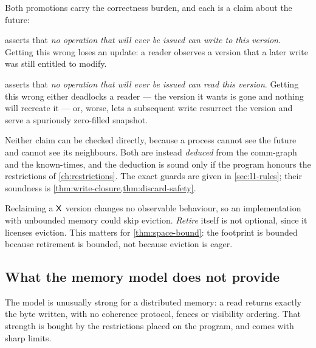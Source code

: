Both promotions carry the correctness burden, and each is a claim about the
future:

\begin{description}[leftmargin=1.4cm,style=nextline,font=\normalfont\bfseries]
  \item[\emph{publish}] asserts that \emph{no operation that will ever be
    issued can write to this version}. Getting this wrong loses an update: a
    reader observes a version that a later write was still entitled to modify.
  \item[\emph{retire}] asserts that \emph{no operation that will ever be
    issued can read this version}. Getting this wrong either deadlocks a
    reader --- the version it wants is gone and nothing will recreate it ---
    or, worse, lets a subsequent write resurrect the version and serve
    a spuriously zero-filled snapshot.
\end{description}

Neither claim can be checked directly, because a process cannot see the future
and cannot see its neighbours. Both are instead \emph{deduced} from the
\gls{comm-graph} and the \glspl{known-time}, and the deduction is sound only if the
program honours the restrictions of \cref{ch:restrictions}. The exact guards are
given in \cref{sec:l1-rules}; their soundness is
\cref{thm:write-closure,thm:discard-safety}.

\begin{remark}
Reclaiming a $\mathsf{X}$ version changes no observable behaviour, so an
implementation with unbounded memory could skip eviction. \emph{Retire} itself
is not optional, since it licenses eviction. This matters for
\cref{thm:space-bound}: the \gls{footprint} is bounded because retirement is
bounded, not because eviction is eager.
\end{remark}

\subsection{What the memory model does not provide}
\label{sec:non-guarantees}

The model is unusually strong for a distributed memory: a read returns
exactly the byte written, with no coherence protocol, fences or visibility
ordering. That strength is bought by the restrictions placed on the program,
and comes with sharp limits.

